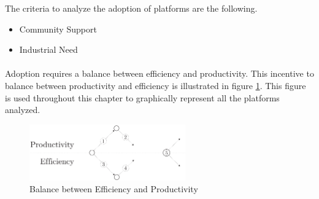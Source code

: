 The criteria to analyze the adoption of platforms are the following.

\begin{itemize}
\item Community Support
\item Industrial Need
\end{itemize}

\paragraph{}

Adoption requires a balance between efficiency and productivity.
This incentive to balance between productivity and efficiency is illustrated in figure \ref{fig:state-of-the-art}.
This figure is used throughout this chapter to graphically represent all the platforms analyzed.

\begin{figure}[h!]
\begin{center}
\includegraphics[width=0.6\textwidth]{../resources/state-of-the-art.pdf}
\end{center}
\caption{Balance between Efficiency and Productivity}
\label{fig:state-of-the-art}
\end{figure}








